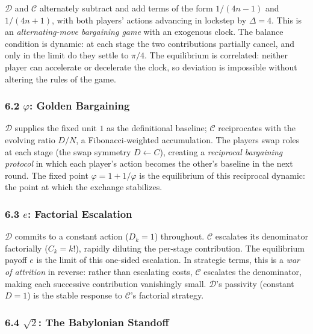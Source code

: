 \documentclass[
  11pt,
  letterpaper,
]{article}
\begin{document}
\(\mathcal{D}\) and \(\mathcal{C}\) alternately subtract and add terms
of the form \(1/(4n-1)\) and \(1/(4n+1)\), with both players' actions
advancing in lockstep by \(\Delta = 4\). This is an
\emph{alternating-move bargaining game} with an exogenous clock. The
balance condition is dynamic: at each stage the two contributions
partially cancel, and only in the limit do they settle to \(\pi/4\). The
equilibrium is correlated: neither player can accelerate or decelerate
the clock, so deviation is impossible without altering the rules of the
game.

\subsubsection{\texorpdfstring{6.2 \(\varphi\): Golden
Bargaining}{6.2 \textbackslash varphi: Golden Bargaining}}\label{varphi-golden-bargaining}

\(\mathcal{D}\) supplies the fixed unit \(1\) as the definitional
baseline; \(\mathcal{C}\) reciprocates with the evolving ratio \(D/N\),
a Fibonacci-weighted accumulation. The players swap roles at each stage
(the swap symmetry \(D \leftarrow C\)), creating a \emph{reciprocal
bargaining protocol} in which each player's action becomes the other's
baseline in the next round. The fixed point \(\varphi = 1 + 1/\varphi\)
is the equilibrium of this reciprocal dynamic: the point at which the
exchange stabilizes.

\subsubsection{\texorpdfstring{6.3 \(e\): Factorial
Escalation}{6.3 e: Factorial Escalation}}\label{e-factorial-escalation}

\(\mathcal{D}\) commits to a constant action (\(D_k = 1\)) throughout.
\(\mathcal{C}\) escalates its denominator factorially (\(C_k = k!\)),
rapidly diluting the per-stage contribution. The equilibrium payoff
\(e\) is the limit of this one-sided escalation. In strategic terms,
this is a \emph{war of attrition} in reverse: rather than escalating
costs, \(\mathcal{C}\) escalates the denominator, making each successive
contribution vanishingly small. \(\mathcal{D}\)'s passivity (constant
\(D = 1\)) is the stable response to \(\mathcal{C}\)'s factorial
strategy.

\subsubsection{\texorpdfstring{6.4 \(\sqrt{2}\): The Babylonian
Standoff}{6.4 \textbackslash sqrt\{2\}: The Babylonian Standoff}}\label{sqrt2-the-babylonian-standoff}
\end{document}
